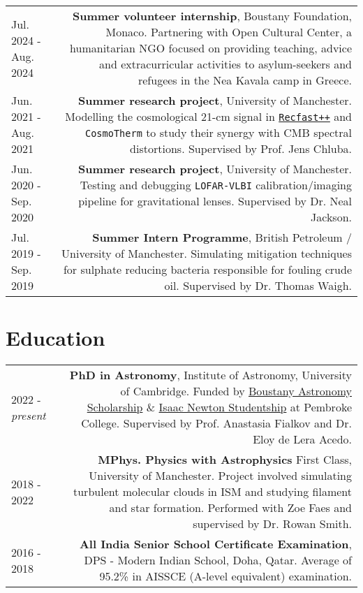 \documentclass{article}
\begin{document}
\begin{tabular}{L!{\vrule}R}
    Jul. 2024 - Aug. 2024 & \textbf{Summer volunteer internship}, Boustany Foundation, Monaco. Partnering with Open Cultural Center, a humanitarian NGO focused on providing teaching, advice and extracurricular activities to asylum-seekers and refugees in the Nea Kavala camp in Greece.  \\
    Jun. 2021 - Aug. 2021 & \textbf{Summer research project}, University of Manchester. Modelling the cosmological 21-cm signal in \href{https://bitbucket.org/Jacetoto/recfast-.vx/src/Recfast_JD_21cm_modelling/}{\texttt{Recfast++}} and \texttt{CosmoTherm} to study their synergy with CMB spectral distortions. Supervised by Prof. Jens Chluba. \\
    Jun. 2020 - Sep. 2020 & \textbf{Summer research project}, University of Manchester. Testing and debugging \texttt{LOFAR-VLBI} calibration/imaging pipeline for gravitational lenses. Supervised by Dr. Neal Jackson.\\
    Jul. 2019 - Sep. 2019 & \textbf{Summer Intern Programme}, British Petroleum / University of Manchester. Simulating mitigation techniques for sulphate reducing bacteria responsible for fouling crude oil. Supervised by Dr. Thomas Waigh. \\
\end{tabular}

\section*{Education}
\begin{tabular}{L!{\vrule}R}
	2022 - \textit{present} & \textbf{PhD in Astronomy}, Institute of Astronomy, University of Cambridge. Funded by \href{https://boustany-foundation.org/scholarship-programmes/astronomy-phd-cambridge/}{Boustany Astronomy Scholarship} \& \href{https://www.cambridgetrust.org/}{Isaac Newton Studentship} at Pembroke College. Supervised by Prof. Anastasia Fialkov and Dr. Eloy de Lera Acedo. \\
	2018 - 2022 & \textbf{MPhys. Physics with Astrophysics} First Class, University of Manchester. Project involved simulating turbulent molecular clouds in ISM and studying filament and star formation. Performed with Zoe Faes and supervised by Dr. Rowan Smith. \\
	2016 - 2018 & \textbf{All India Senior School Certificate Examination}, DPS - Modern Indian School, Doha, Qatar. Average of 95.2\% in AISSCE (A-level equivalent) examination.
\end{tabular}
\end{document}
